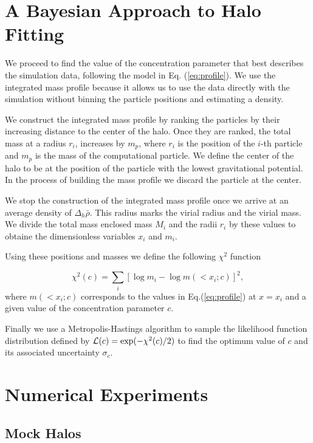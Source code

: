 \documentclass[useAMS,usenatbib]{mn2e}
\begin{document}
\section{A Bayesian Approach to Halo Fitting}
\label{sec:method}


We proceed to find the value of the concentration parameter that
best describes the simulation data, following the model in
Eq. (\ref{eq:profile}). We use the integrated mass profile because it
allows us to use the data directly with the simulation without binning
the particle positions and estimating a density.

We construct the integrated mass profile by ranking the particles by
their increasing distance to the center of the halo. Once they are ranked,
the total mass at a radius $r_i$, increases by $m_p$, where $r_i$ is
the position of the $i$-th particle and $m_p$ is the mass of the
computational particle.  We define the center of the halo to be  at
the position of the particle with the lowest gravitational
potential. In the process of building the mass profile we discard the
particle at the center.

We stop the construction of the integrated mass profile once we arrive
at an average density of $\Delta_h\bar{\rho}$. This radius marks the
virial radius and the virial mass. We divide the total mass enclosed
mass $M_i$ and the radii $r_i$ by these values to obtaine the
dimensionless variables $x_i$ and $m_i$. 

Using these positions and masses we define the following $\chi^2$ function

\begin{equation}
\chi^2(c) = \sum_{i}[\log m_i - \log m(< x_i;c)]^2, 
\end{equation}
%
where $m(<x_i;c)$ corresponds to the values in Eq.(\ref{eq:profile}) at
$x=x_i$ and a given value of the concentration parameter $c$.

Finally we use a Metropolis-Hastings algorithm to sample the likelihood
function distribution defined by ${\cal L}(c)=\exp(-\chi^2(c)/2)$ to
find the optimum value of $c$ and its associated uncertainty
$\sigma_c$. 

\section{Numerical Experiments}

\subsection{Mock Halos}
\end{document}
